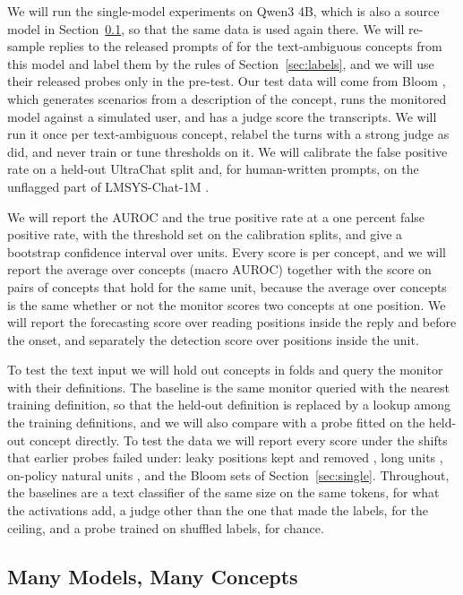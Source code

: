 \documentclass{article}
\begin{document}
We will run the single-model experiments on Qwen3 4B, which is also a source model in Section~\ref{sec:multi}, so that the same data is used again there. We will re-sample replies to the released prompts of \cite{zhou2026} for the text-ambiguous concepts from this model and label them by the rules of Section~\ref{sec:labels}, and we will use their released probes only in the pre-test. Our test data will come from Bloom \citep{bloom2025}, which generates scenarios from a description of the concept, runs the monitored model against a simulated user, and has a judge score the transcripts. We will run it once per text-ambiguous concept, relabel the turns with a strong judge as \cite{zhou2026} did, and never train or tune thresholds on it. We will calibrate the false positive rate on a held-out UltraChat split and, for human-written prompts, on the unflagged part of LMSYS-Chat-1M \citep{zheng2024lmsys}.

We will report the AUROC and the true positive rate at a one percent false positive rate, with the threshold set on the calibration splits, and give a bootstrap confidence interval over units. Every score is per concept, and we will report the average over concepts (macro AUROC) together with the score on pairs of concepts that hold for the same unit, because the average over concepts is the same whether or not the monitor scores two concepts at one position. We will report the forecasting score over reading positions inside the reply and before the onset, and separately the detection score over positions inside the unit.

To test the text input we will hold out concepts in folds and query the monitor with their definitions. The baseline is the same monitor queried with the nearest training definition, so that the held-out definition is replaced by a lookup among the training definitions, and we will also compare with a probe fitted on the held-out concept directly. To test the data we will report every score under the shifts that earlier probes failed under: leaky positions kept and removed \citep{boxo2025}, long units \citep{kramar2026}, on-policy natural units \citep{kirch2025}, and the Bloom sets of Section~\ref{sec:single}. Throughout, the baselines are a text classifier of the same size on the same tokens, for what the activations add, a judge other than the one that made the labels, for the ceiling, and a probe trained on shuffled labels, for chance.

\subsection{Many Models, Many Concepts}
\label{sec:multi}
\end{document}
